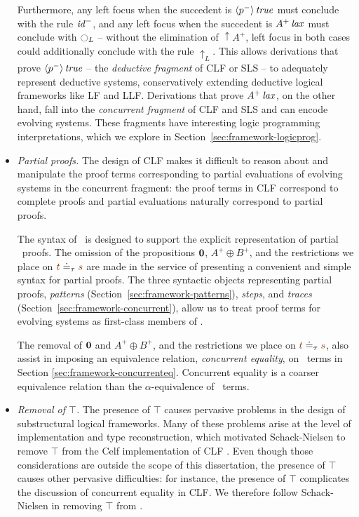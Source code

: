 \begin{itemize}
  Furthermore, any left focus when the succedent is
  ${\langle {p^-} \rangle}\,{{\it true}}$ must conclude with the rule ${\it id}^-$, and
  any left focus when the succedent is ${A^+}\,{{\it lax}}$ must conclude
  with ${\ocircle}_L$ -- without the elimination of ${\uparrow}A^+$,
  left focus in both cases could additionally conclude with the rule
  ${\uparrow}_L$. This allows derivations that prove
  ${\langle {p^-} \rangle}\,{{\it true}}$ -- the {\it deductive fragment} of CLF or SLS
  -- to adequately represent deductive systems, conservatively
  extending deductive logical frameworks like LF and LLF. Derivations
  that prove ${A^+}\,{{\it lax}}$, on the other hand, fall into the {\it
    concurrent fragment} of CLF and SLS and can encode evolving
  systems. These fragments have interesting
  logic programming interpretations, which we explore in
  Section~\ref{sec:framework-logicprog}.
 
\item{\it Partial proofs.} The design of CLF makes it difficult to
  reason about and manipulate the proof terms corresponding to partial
  evaluations of evolving systems in the concurrent fragment: the proof
  terms in CLF correspond to complete proofs and partial evaluations
  naturally correspond to partial proofs.

  The syntax of \sls~is designed to support the explicit
  representation of partial \ollll~proofs. The omission of the
  propositions $\mathbf{0}$, $A^+ \oplus B^+$, and the restrictions we
  place on $\lf{t} \doteq_\tau \lf{s}$ are made in the service of
  presenting a convenient and simple syntax for partial proofs. The
  three syntactic objects representing partial proofs, {\it patterns}
  (Section~\ref{sec:framework-patterns}), {\it steps}, and {\it
    traces} (Section~\ref{sec:framework-concurrent}), allow us to
  treat proof terms for evolving systems as first-class members of
  \sls.

  The removal of $\mathbf{0}$ and $A^+ \oplus B^+$, and the restrictions we
  place on $\lf{t} \doteq_\tau \lf{s}$, also assist in imposing an
  equivalence relation, {\it concurrent equality}, on \sls~terms
  in Section \ref{sec:framework-concurrenteq}. Concurrent equality is a coarser
  equivalence relation than the $\alpha$-equivalence of \ollll~terms.

\item{\it Removal of $\top$.} The presence of $\top$ causes pervasive
  problems in the design of substructural logical frameworks. Many of
  these problems arise at the level of implementation and type
  reconstruction, which motivated Schack-Nielsen to remove $\top$ from
  the Celf implementation of CLF
  \cite{schacknielsen11implementing}. Even though those considerations
  are outside the scope of this dissertation, the presence of $\top$ causes
  other pervasive difficulties: for instance, the presence of $\top$
  complicates the discussion of concurrent equality in CLF. We therefore
  follow Schack-Nielsen in removing $\top$ from \sls.

\end{itemize}
